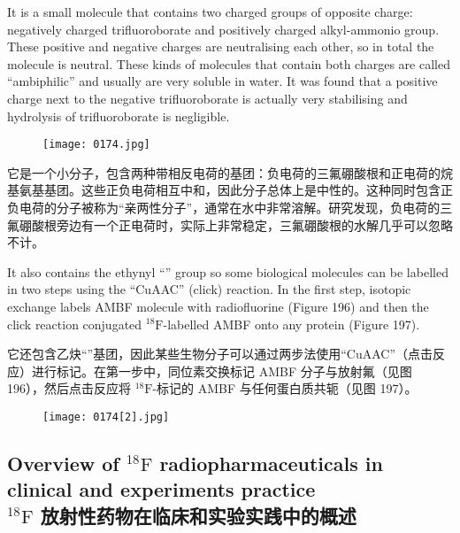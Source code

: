 \documentclass[dvipsnames, svgnames,a4paper,11pt]{article}
\begin{document}
It is a small molecule that contains two charged groups of opposite charge:
negatively charged trifluoroborate and positively charged alkyl-ammonio group.
These positive and negative charges are neutralising each other, so in total the
molecule is neutral. These kinds of molecules that contain both charges are called
“ambiphilic” and usually are very soluble in water. It was found that a positive charge
next to the negative trifluoroborate is actually very stabilising and hydrolysis of
trifluoroborate is negligible.

\begin{figure}[h]
	\centering
    \texttt{[image: 0174.jpg]}   
     \label{fig196}
\end{figure}

它是一个小分子，包含两种带相反电荷的基团：负电荷的三氟硼酸根和正电荷的烷基氨基基团。这些正负电荷相互中和，因此分子总体上是中性的。这种同时包含正负电荷的分子被称为“亲两性分子”，通常在水中非常溶解。研究发现，负电荷的三氟硼酸根旁边有一个正电荷时，实际上非常稳定，三氟硼酸根的水解几乎可以忽略不计。

It also contains the ethynyl “” group so some biological molecules can be
labelled in two steps using the “CuAAC” (click) reaction. In the first step, isotopic
exchange labels AMBF molecule with radiofluorine (Figure 196) and then the click
reaction conjugated ${}^\mathrm{18}\mathrm{F}$-labelled AMBF onto any protein (Figure 197).


它还包含乙炔“”基团，因此某些生物分子可以通过两步法使用“CuAAC”（点击反应）进行标记。在第一步中，同位素交换标记 AMBF 分子与放射氟（见图 196），然后点击反应将 ${}^\mathrm{18}\mathrm{F}$-标记的 AMBF 与任何蛋白质共轭（见图 197）。

\begin{figure}[h]
	\centering
    \texttt{[image: 0174[2].jpg]}   
     \label{fig197}
\end{figure}

\subsection{Overview of ${}^\mathrm{18}\mathrm{F}$ radiopharmaceuticals in clinical and experiments practice \\${}^\mathrm{18}\mathrm{F}$ 放射性药物在临床和实验实践中的概述}
\end{document}
